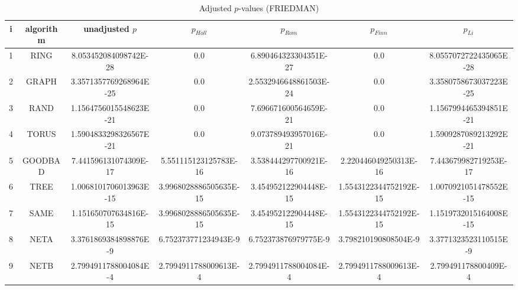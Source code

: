 \documentclass[a4paper,10pt]{article}
\begin{document}
\begin{landscape}
\begin{table}[!htp]
\centering\scriptsize
\caption{Adjusted $p$-values (FRIEDMAN)}
\begin{tabular}{ccccccc}
i&algorithm&unadjusted $p$&$p_{Holl}$&$p_{Rom}$&$p_{Finn}$&$p_{Li}$\\
\hline
1& RING&8.053452084098742E-28&0.0&6.890464323304351E-27&0.0&8.0557072722435065E-28\\
2& GRAPH&3.3571357769268964E-25&0.0&2.5532946648861503E-24&0.0&3.3580758673037223E-25\\
3& RAND&1.1564756015548623E-21&0.0&7.696671600564659E-21&0.0&1.1567994465394851E-21\\
4& TORUS&1.5904833298326567E-21&0.0&9.073789493957016E-21&0.0&1.5909287089213292E-21\\
5& GOODBAD&7.441596131074309E-17&5.551115123125783E-16&3.538444297700921E-16&2.220446049250313E-16&7.443679982719253E-17\\
6& TREE&1.0068101706013963E-15&3.9968028886505635E-15&3.454952122904448E-15&1.5543122344752192E-15&1.0070921051478552E-15\\
7& SAME&1.151650707634816E-15&3.9968028886505635E-15&3.454952122904448E-15&1.5543122344752192E-15&1.1519732015164008E-15\\
8& NETA&3.3761869384898876E-9&6.752373771234943E-9&6.752373876979775E-9&3.798210190808504E-9&3.3771323523110515E-9\\
9& NETB&2.7994911788004084E-4&2.7994911788009613E-4&2.7994911788004084E-4&2.7994911788009613E-4&2.799491178800409E-4\\
\hline
\end{tabular}
\end{table}


\newpage


\end{landscape}
\end{document}
